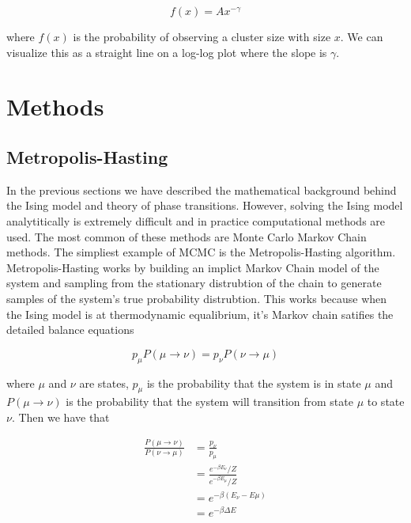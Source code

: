 \documentclass{article}
\begin{document}
\begin{equation}
    f(x) = A x^{-\gamma}
\end{equation}

where $f(x)$ is the probability of observing a cluster size with size $x$. We can visualize this as a straight line
on a log-log plot where the slope is $\gamma$.

\section{Methods}
\label{Methods}

\subsection{Metropolis-Hasting}
In the previous sections we have described the mathematical background behind the Ising model and theory of phase transitions.
However, solving the Ising model analytitically is extremely difficult and in practice computational methods are used. The most common of these methods 
are Monte Carlo Markov Chain methods. The simpliest example of MCMC is the Metropolis-Hasting algorithm. Metropolis-Hasting works by building 
an implict Markov Chain model of the system and sampling from the stationary distrubtion of the chain to generate samples of the system's true probability
distrubtion. This works because when the Ising model is at thermodynamic equalibrium, it's Markov chain satifies the detailed balance equations

\begin{equation}
    p_{\mu} P(\mu \rightarrow \nu) = p_{\nu} P(\nu \rightarrow \mu)
\end{equation}

where $\mu$ and $\nu$ are states, $p_{\mu}$ is the probability that the system is in state $\mu$ and $P(\mu \rightarrow \nu)$
is the probability that the system will transition from state $\mu$ to state $\nu$. Then we have that 

\begin{align}
    \frac{P(\mu \rightarrow \nu)}{P(\nu \rightarrow \mu)}
    &= \frac{p_{\nu}}{p_{\mu}} \\
    &= \frac{e^{-\beta E_{\nu}} / Z}{e^{-\beta E_{\mu}} / Z} \\
    &= e^{-\beta(E_{\nu} - E{\mu})} \\
    &= e^{-\beta \Delta E}
\end{align}
\end{document}
